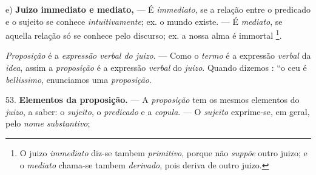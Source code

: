 e) \textbf{Juizo immediato e mediato,} --- É \emph{immediato}, se a relação entre o predicado e o sujeito se conhece \emph{intuitivamente}; ex. o mundo existe. --- É \emph{mediato}, se aquella relação só se conhece pelo discurso; ex. a nossa alma é immortal \footnote{O juizo \emph{immediato} diz-se tambem \emph{primitivo}, porque não \emph{suppõe} outro juizo; e o \emph{mediato} chama-se tambem \emph{derivado}, pois deriva de outro juizo.}.


\emph{Proposição} é a \emph{expressão verbal do juizo}. --- Como o \emph{termo} é a expressão \emph{verbal} da \emph{idea}, assim a \emph{proposição} é a expressão \emph{verbal} do \emph{juizo}. Quando dizemos : “o ceu é \emph{bellissimo}, enunciamos uma \emph{proposição}.

53. \textbf{Elementos da proposição.} --- A \emph{proposição} tem os mesmos elementos do \emph{juizo}, a saber: o \emph{sujeito}, o \emph{predicado} e a   \emph{copula}. --- O \emph{sujeito} exprime-se, em geral, pelo \emph{nome substantivo};

